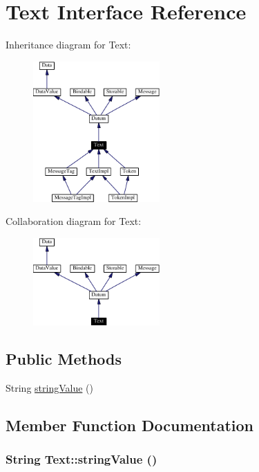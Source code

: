 \hypertarget{interfaceText}{
\section{Text  Interface Reference}
\label{interfaceText}
}
Inheritance diagram for Text:\begin{figure}[H]
\begin{center}
\leavevmode
\includegraphics[width=137pt]{interfaceText__inherit__graph}
\end{center}
\end{figure}
Collaboration diagram for Text:\begin{figure}[H]
\begin{center}
\leavevmode
\includegraphics[width=137pt]{interfaceText__coll__graph}
\end{center}
\end{figure}
\subsection*{Public Methods}
\begin{CompactItemize}
\item 
String \hyperlink{interfaceText_a0}{string\-Value} ()
\end{CompactItemize}


\subsection{Member Function Documentation}
\hypertarget{interfaceText_a0}{
\subsubsection[stringValue]{\setlength{\rightskip}{0pt plus 5cm}String Text::string\-Value ()}}
\label{interfaceText_a0}




